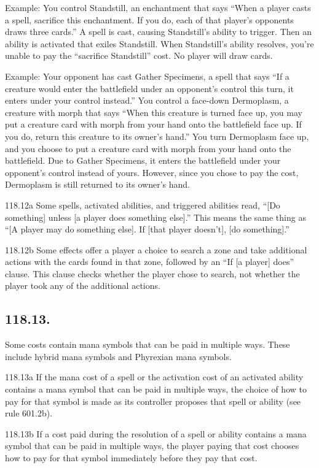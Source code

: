 Example: You control Standstill, an enchantment that says “When a player casts a spell, sacrifice this enchantment. If you do, each of that player’s opponents draws three cards.” A spell is cast, causing Standstill’s ability to trigger. Then an ability is activated that exiles Standstill. When Standstill’s ability resolves, you’re unable to pay the “sacrifice Standstill” cost. No player will draw cards.

Example: Your opponent has cast Gather Specimens, a spell that says “If a creature would enter the battlefield under an opponent’s control this turn, it enters under your control instead.” You control a face-down Dermoplasm, a creature with morph that says “When this creature is turned face up, you may put a creature card with morph from your hand onto the battlefield face up. If you do, return this creature to its owner’s hand.” You turn Dermoplasm face up, and you choose to put a creature card with morph from your hand onto the battlefield. Due to Gather Specimens, it enters the battlefield under your opponent’s control instead of yours. However, since you chose to pay the cost, Dermoplasm is still returned to its owner’s hand.

118.12a Some spells, activated abilities, and triggered abilities read, “[Do something] unless [a player does something else].” This means the same thing as “[A player may do something else]. If [that player doesn’t], [do something].”

118.12b Some effects offer a player a choice to search a zone and take additional actions with the cards found in that zone, followed by an “If [a player] does” clause. This clause checks whether the player chose to search, not whether the player took any of the additional actions.

\subsection*{118.13.}
Some costs contain mana symbols that can be paid in multiple ways. These include hybrid mana symbols and Phyrexian mana symbols.

118.13a If the mana cost of a spell or the activation cost of an activated ability contains a mana symbol that can be paid in multiple ways, the choice of how to pay for that symbol is made as its controller proposes that spell or ability (see rule 601.2b).

118.13b If a cost paid during the resolution of a spell or ability contains a mana symbol that can be paid in multiple ways, the player paying that cost chooses how to pay for that symbol immediately before they pay that cost.

